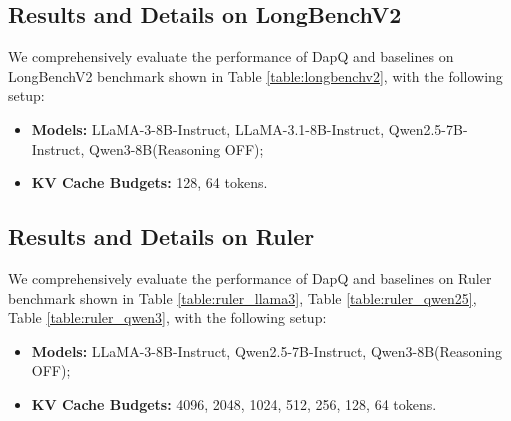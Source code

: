 \documentclass[11pt]{article}
\begin{document}
\subsection{Results and Details on LongBenchV2}
We comprehensively evaluate the performance of DapQ and baselines on LongBenchV2 benchmark shown in Table \ref{table:longbenchv2}, with the following setup:
\begin{itemize}[leftmargin=*, nosep] %
    \item \textbf{Models:} LLaMA-3-8B-Instruct, LLaMA-3.1-8B-Instruct, Qwen2.5-7B-Instruct, Qwen3-8B(Reasoning OFF);
    \item \textbf{KV Cache Budgets:} 128, 64 tokens.
\end{itemize}



\subsection{Results and Details on Ruler}
We comprehensively evaluate the performance of DapQ and baselines on Ruler benchmark shown in Table \ref{table:ruler_llama3}, Table \ref{table:ruler_qwen25}, Table \ref{table:ruler_qwen3}, with the following setup:
\begin{itemize}[leftmargin=*, nosep] %
    \item \textbf{Models:} LLaMA-3-8B-Instruct, Qwen2.5-7B-Instruct, Qwen3-8B(Reasoning OFF);
    \item \textbf{KV Cache Budgets:} 4096, 2048, 1024, 512, 256, 128, 64 tokens.
\end{itemize}
\end{document}
